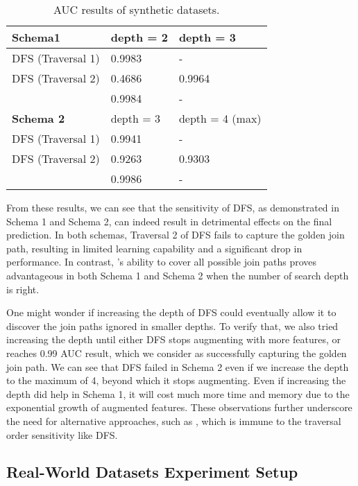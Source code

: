\begin{table}
    \caption{AUC results of synthetic datasets.}
    \centering
    \renewcommand\arraystretch{1.25}
    \begin{tabular}{l|l|l}
        \toprule 
        \textbf{Schema1} & depth = 2 & depth = 3 \\
        \midrule
        DFS (Traversal 1) & 0.9983 & - \\
        DFS (Traversal 2) & 0.4686 & 0.9964 \\
        \model{}          & 0.9984 & - \\
        \midrule
        \textbf{Schema 2} & depth = 3 & depth = 4 (max)\\
        \midrule
        DFS (Traversal 1) & 0.9941 & - \\
        DFS (Traversal 2) & 0.9263 & 0.9303 \\
        \model{}          & 0.9986 & - \\
        \bottomrule
    \end{tabular}
    \label{tab:syn}
\end{table}

From these results, we can see that the sensitivity of DFS, as demonstrated in Schema 1 and Schema 2, can indeed result in detrimental effects on the final prediction. In both schemas, Traversal 2 of DFS fails to capture the golden join path, resulting in limited learning capability and a significant drop in performance. In contrast, \model{}'s ability to cover all possible join paths proves advantageous in both Schema 1 and Schema 2 when the number of search depth is right.

One might wonder if increasing the depth of DFS could eventually allow it to discover the join paths ignored in smaller depths.  To verify that, we also tried increasing the depth until either DFS stops augmenting with more features, or reaches 0.99 AUC result, which we consider as successfully capturing the golden join path.  We can see that DFS failed in Schema 2 even if we increase the depth to the maximum of 4, beyond which it stops augmenting.  Even if increasing the depth did help in Schema 1, it will cost much more time and memory due to the exponential growth of augmented features.  These observations further underscore the need for alternative approaches, such as \model{}, which is immune to the traversal order sensitivity like DFS. %

\subsection{Real-World Datasets Experiment Setup}
